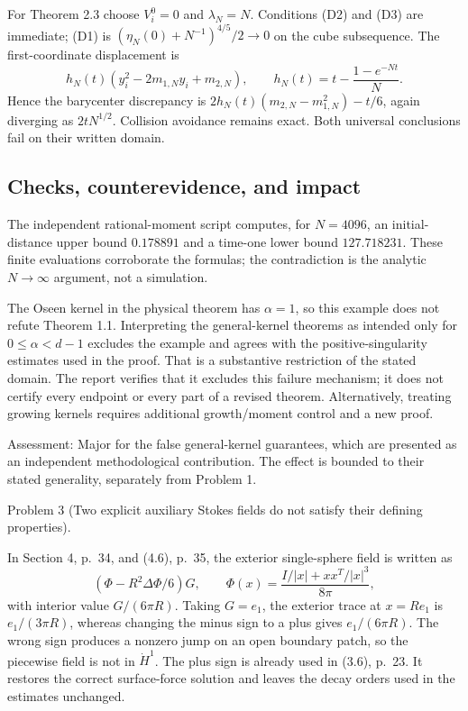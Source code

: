 \documentclass[10pt]{article}
\begin{document}
For Theorem 2.3 choose \(V_i^0=0\) and \(\lambda_N=N\). Conditions (D2) and (D3) are immediate; (D1) is \((\eta_N(0)+N^{-1})^{4/5}/2\to0\) on the cube subsequence. The first-coordinate displacement is \[h_N(t)(y_i^2-2m_{1,N}y_i+m_{2,N}),\qquad
 h_N(t)=t-\frac{1-e^{-Nt}}N.\] Hence the barycenter discrepancy is \(2h_N(t)(m_{2,N}-m_{1,N}^2)-t/6\), again diverging as \(2tN^{1/2}\). Collision avoidance remains exact. Both universal conclusions fail on their written domain.\par
\subsection*{Checks, counterevidence, and impact}
The independent rational-moment script computes, for \(N=4096\), an initial-distance upper bound \(0.178891\) and a time-one lower bound \(127.718231\). These finite evaluations corroborate the formulas; the contradiction is the analytic \(N\to\infty\) argument, not a simulation.\par
The Oseen kernel in the physical theorem has \(\alpha=1\), so this example does not refute Theorem 1.1. Interpreting the general-kernel theorems as intended only for \(0\le\alpha<d-1\) excludes the example and agrees with the positive-singularity estimates used in the proof. That is a substantive restriction of the stated domain. The report verifies that it excludes this failure mechanism; it does not certify every endpoint or every part of a revised theorem. Alternatively, treating growing kernels requires additional growth/moment control and a new proof.\par
Assessment: Major for the false general-kernel guarantees, which are presented as an independent methodological contribution. The effect is bounded to their stated generality, separately from Problem 1.\par
Problem 3 (Two explicit auxiliary Stokes fields do not satisfy their defining properties).\par
In Section 4, p. 34, and (4.6), p. 35, the exterior single-sphere field is written as \[(\Phi-R^2\Delta\Phi/6)G,\qquad
 \Phi(x)=\frac{I/|x|+xx^{T}/|x|^3}{8\pi},\] with interior value \(G/(6\pi R)\). Taking \(G=e_1\), the exterior trace at \(x=Re_1\) is \(e_1/(3\pi R)\), whereas changing the minus sign to a plus gives \(e_1/(6\pi R)\). The wrong sign produces a nonzero jump on an open boundary patch, so the piecewise field is not in \(\dot H^1\). The plus sign is already used in (3.6), p. 23. It restores the correct surface-force solution and leaves the decay orders used in the estimates unchanged.\par
\end{document}
